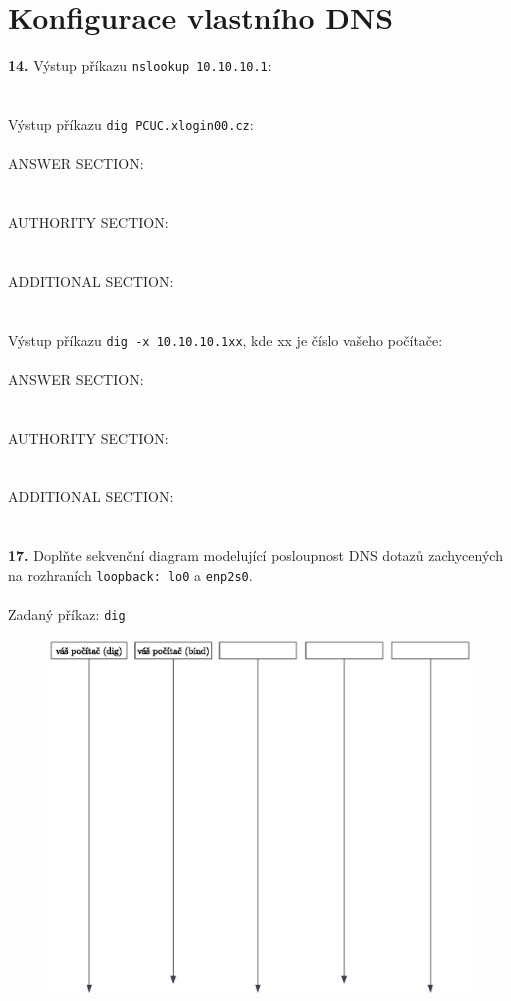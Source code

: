 \section{Konfigurace vlastního DNS}
\textbf{14.} Výstup příkazu \texttt{nslookup 10.10.10.1}:
\\
\\
\\
\hspace*{0.7cm} Výstup příkazu \texttt{dig PCUC.xlogin00.cz}:
\\
\\
\hspace*{0.8cm}ANSWER SECTION:
\\
\\
\\
\hspace*{0.8cm}AUTHORITY SECTION:
\\
\\
\\
\hspace*{0.8cm}ADDITIONAL SECTION:
\\
\\
\\
\hspace*{0.7cm} Výstup příkazu \texttt{dig -x 10.10.10.1xx}, kde xx je číslo vašeho počítače:
\\
\\
\hspace*{0.8cm}ANSWER SECTION:
\\
\\
\\
\hspace*{0.8cm}AUTHORITY SECTION:
\\
\\
\\
\hspace*{0.8cm}ADDITIONAL SECTION:
\\
\\
\\
\textbf{17.} Doplňte sekvenční diagram modelující posloupnost DNS dotazů zachycených na rozhraních \texttt{loopback: lo0} a \texttt{enp2s0}.
\\
\\
\hspace*{0.8cm}Zadaný příkaz: \texttt{dig }\underline{\hspace{4.5cm}}
\begin{figure}[h]
	\centering
	\includegraphics[bb=0 365 550 130, clip=true]{dia.eps}
\end{figure}
